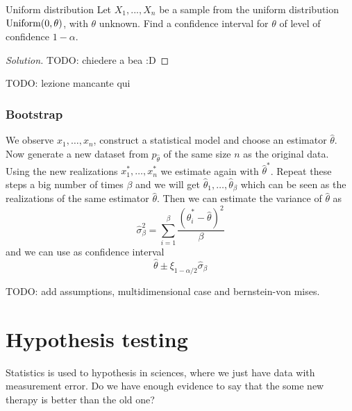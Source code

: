 \documentclass[12pt]{extarticle}
\newcommand{\Uniform}{{\operatorfont Uniform}}
\begin{document}
\begin{example}{Uniform distribution}{}
    Let $X_1,...,X_n$ be a sample from the uniform distribution $\Uniform(0,\theta)$, with $\theta$ unknown.
    Find a confidence interval for $\theta$ of level of confidence $1 - \alpha$.
\end{example}

\begin{proof}[Solution]
    TODO: chiedere a bea :D
\end{proof}

TODO: lezione mancante qui

\subsubsection{Bootstrap}

We observe $x_1, \dots, x_n$, construct a statistical model and choose an estimator $\hat \theta$.
Now generate a new dataset from $p_{\hat\theta}$ of the same size $n$ as the original data.
Using the new realizations $x_1^*, \dots, x_n^*$ we estimate again with $\hat \theta^*$.
Repeat these steps a big number of times $\beta$ and we will get $\hat \theta_1, \dots, \hat \theta_\beta$ which can be seen as the realizations of the same estimator $\hat \theta$.
Then we can estimate the variance of $\hat \theta$ as
\begin{equation}
    \hat \sigma_{\beta}^2 = \sum_{i = 1}^\beta \frac{(\hat \theta_i^* - \hat \theta)^2}{\beta}
\end{equation}
and we can use as confidence interval
\begin{equation}
    \hat \theta \pm \xi_{1 - \alpha/2} \hat \sigma_\beta
\end{equation}

TODO: add assumptions, multidimensional case and bernstein-von mises.

\section{Hypothesis testing}

Statistics is used to  hypothesis in sciences, where we just have data with measurement error.
Do we have enough evidence to say that the some new therapy is better than the old one?
\end{document}
